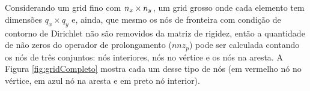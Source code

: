 Considerando um grid fino com $n_x \times n_y$, um grid grosso onde cada elemento tem dimensões $q_x \times q_y$  e, ainda, que mesmo os nós de fronteira com condição de contorno de Dirichlet não são removidos da matriz de rigidez, então a quantidade de não zeros do operador de prolongamento ($nnz_p$) pode ser calculada contando os nós de três conjuntos:  nós interiores, nós no vértice e os nós na aresta.  A Figura \ref{fig:gridCompleto} mostra cada um desse tipo de nós (em vermelho nó no vértice, em azul nó na aresta e em preto nó interior).


\begin{figure}[h]
\center
{}
\qquad
{}

\end{figure}

